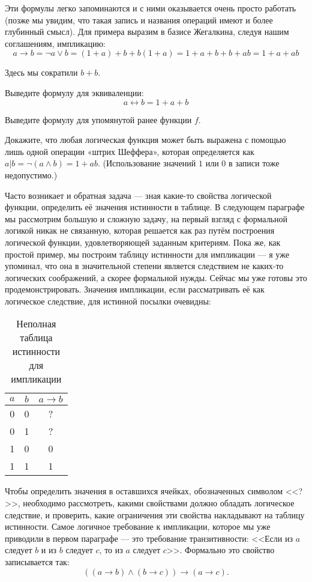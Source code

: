 Эти формулы легко запоминаются и с ними оказывается очень просто работать (позже мы увидим, что такая запись и названия операций имеют и более глубинный смысл). Для примера выразим в базисе Жегалкина, следуя нашим соглашениям, импликацию: $$a \rightarrow b = \neg a \lor b = (1 + a) + b + b(1 + a) = 1 + a + b + b + ab = 1 + a + ab$$

Здесь мы сократили $b+b$.

\begin{exercise} Выведите формулу для эквиваленции: $$a \leftrightarrow b = 1 + a + b$$\end{exercise}

\begin{exercise} Выведите формулу для упомянутой ранее функции $f$.\end{exercise}

\begin{exercise} Докажите, что любая логическая функция может быть выражена с помощью лишь одной операции «штрих Шеффера», которая определяется как $a|b = \neg(a\land b) = 1 + ab$. (Использование значений $1$ или $0$ в записи тоже недопустимо.)\end{exercise}

Часто возникает и обратная задача --- зная какие-то свойства логической функции, определить её значения истинности в таблице. В следующем параграфе мы рассмотрим большую и сложную задачу, на первый взгляд с формальной логикой никак не связанную, которая решается как раз путём построения логической функции, удовлетворяющей заданным критериям. Пока же, как простой пример, мы построим таблицу истинности для импликации --- я уже упоминал, что она в значительной степени является следствием не каких-то логических соображений, а скорее формальной нужды. Сейчас мы уже готовы это продемонстрировать. Значения импликации, если рассматривать её как логическое следствие, для истинной посылки очевидны:

\begin{table}[h]
\centering
\begin{tabular}{cc|c}
$a$ & $b$ & $a \to b$ \\
\hline
0 & 0 & ? \\
0 & 1 & ? \\
1 & 0 & 0 \\
1 & 1 & 1
\end{tabular}
\caption{Неполная таблица истинности для импликации}
\end{table}

Чтобы определить значения в оставшихся ячейках, обозначенных символом <<?>>, необходимо рассмотреть, какими свойствами должно обладать логическое следствие, и проверить, какие ограничения эти свойства накладывают на таблицу истинности. Самое логичное требование к импликации, которое мы уже приво\-ди\-ли в первом параграфе --- это требование транзитивности: \mbox{<<Если} из $a$ следует $b$ и из $b$ следует $c$, то из $a$ следует $c$>>. Формально это свойство записывается так: $$((a\to b) \land (b \to c)) \to (a\to c).$$

